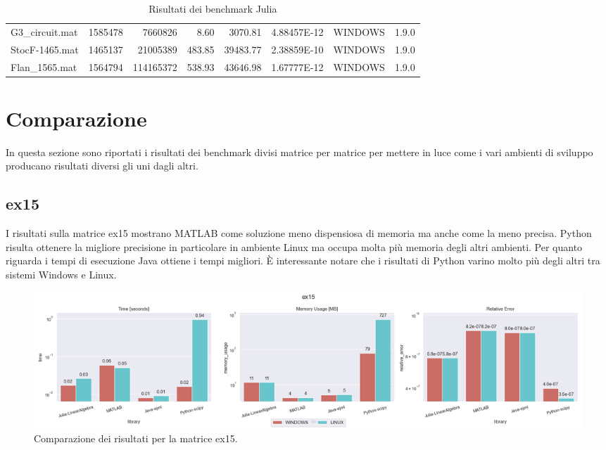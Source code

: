 \documentclass{report}
\begin{document}
\begin{table}[h]
{\begin{tabular}{@{}lrrrrrcc@{}}
                    G3\_circuit.mat     & 1585478 & 7660826   & 8.60   & 3070.81  & 4.88457E-12 & WINDOWS & 1.9.0 \\
                    StocF-1465.mat      & 1465137 & 21005389  & 483.85 & 39483.77 & 2.38859E-10 & WINDOWS & 1.9.0 \\
                    Flan\_1565.mat      & 1564794 & 114165372 & 538.93 & 43646.98 & 1.67777E-12 & WINDOWS & 1.9.0 \\ \bottomrule
                    \end{tabular}%
                    }
                    \caption{Risultati dei benchmark Julia}
                    \label{tab:result_julia}
                \end{table}
            
        \section{Comparazione}
            In questa sezione sono riportati i risultati dei benchmark divisi
            matrice per matrice per mettere in luce come i vari ambienti di 
            sviluppo producano risultati diversi gli uni dagli altri.
            \subsection{ex15}
                I risultati sulla matrice ex15 mostrano MATLAB come soluzione 
                meno dispensiosa di memoria ma anche come la meno precisa.
                Python risulta ottenere la migliore precisione in particolare 
                in ambiente Linux ma occupa molta più memoria degli altri 
                ambienti. Per quanto riguarda i tempi di esecuzione Java ottiene
                i tempi migliori. \`E interessante notare che i risultati di
                Python varino molto più degli altri tra sistemi Windows e Linux.
                \begin{figure}[h]
                    \includegraphics[width=\textwidth]{ex15}
                    \caption{Comparazione dei risultati per la matrice ex15.}
                    \label{fig:ex15}
                \end{figure}
\end{document}
